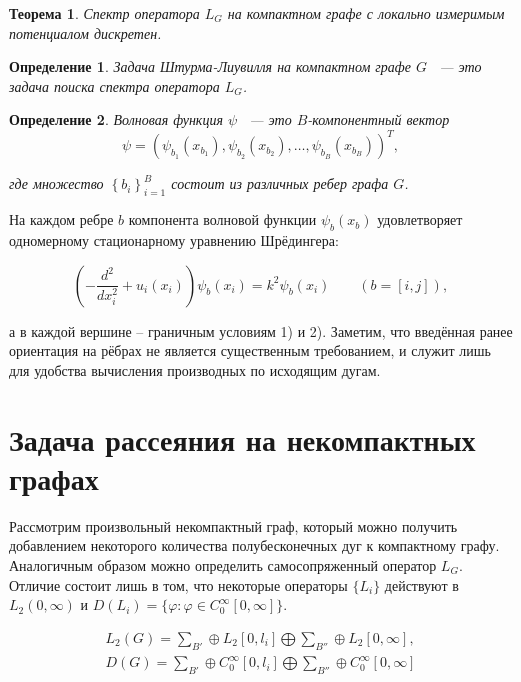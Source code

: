 \documentclass[a4 paper, 12 pt]{extarticle}
\newtheorem{theorem}{Теорема}[section]
\newtheorem{Def}{Определение}[section]
\begin{document}
  \begin{theorem}
	Спектр оператора $L_{G}$ на компактном графе с локально измеримым
	потенциалом дискретен.
  \end{theorem}

  \begin{Def}
  	Задача Штурма-Лиувилля на компактном графе $G$ ~--- это задача поиска спектра оператора $L_{G}$.
  \end{Def}

  \begin{Def}
  	Волновая функция $\psi$ ~--- это $B$-компонентный вектор $$\psi=\left(\psi_{b_1}(x_{b_1}),
  	\psi_{b_2}(x_{b_2}),\ldots,\psi_{b_B}(x_{b_B})\right)^T,$$
  	
  	где множество $\left\{b_i\right\}_{i=1}^{B}$ состоит из различных
  	ребер графа $G$.
  \end{Def}

  На каждом ребре $b$ компонента волновой функции $\psi_b(x_b)$
  удовлетворяет одномерному стационарному уравнению Шрёдингера:

  \begin{equation}\label{Shred1}
   \left(-\frac{d^2}{dx_i^2} +
    u_i(x_i)\right)\psi_b(x_{i})=k^2\psi_b(x_{i})\qquad(b=[i,j]),
  \end{equation}

  а в каждой вершине -- граничным условиям 1) и 2). Заметим, что
  введённая ранее ориентация на рёбрах не является существенным
  требованием, и служит лишь для удобства вычисления производных по
  исходящим дугам.
  
  \pagebreak
  
  \section{Задача рассеяния на некомпактных графах}
  
  Рассмотрим произвольный некомпактный граф, который можно получить добавлением некоторого количества полубесконечных дуг к компактному графу.
  Аналогичным образом можно определить самосопряженный оператор
  $L_G$. Отличие состоит лишь в том, что некоторые операторы
  $\{L_i\}$ действуют в $L_2(0, \infty)$ и
  $D(L_i)=\{\varphi:\varphi\in C_0^\infty[0,\infty]\}$.
  
  \begin{gather*}
  L_2(G)=\sum_{B'}\oplus L_2[0, l_i]\bigoplus\sum_{B''}\oplus
  L_2[0,\infty],
  \\
  D(G)=\sum_{B'}\oplus C_0^\infty[0,l_i]\bigoplus\sum_{B''}\oplus
  C_0^\infty[0,\infty]
  \end{gather*}
  
\end{document}

